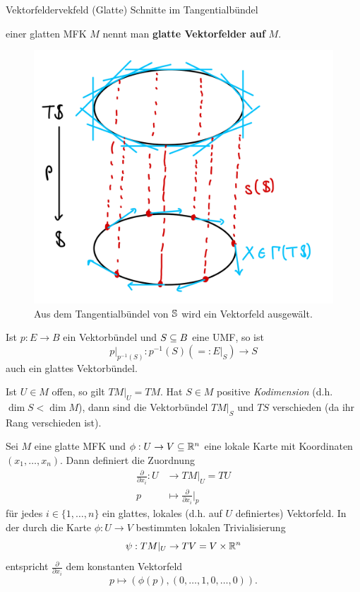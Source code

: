 \begin{definition}{Vektorfelder}{vekfeld}
(Glatte) Schnitte im Tangentialbündel 
einer glatten MFK $M$ nennt man \textbf{glatte Vektorfelder auf} $M$.
\begin{figure}[H]
\label{fig:vektorfeldaustang}
\centering
\includegraphics[width=0.3\linewidth]{Bilder/vektorfeldsph.png}
\caption{Aus dem Tangentialbündel von $\mathbb{S}$ wird ein Vektorfeld ausgewält.}
\end{figure}
\end{definition}
\begin{bemerkung}
Ist $p: E \to B$ ein Vektorbündel und $S \subseteq B$ eine UMF, so ist
\begin{equation}
p|_{p^{-1}(S)}: p^{-1}(S) (=: E|_S) \to S
\end{equation}
auch ein glattes Vektorbündel.
\end{bemerkung}
\begin{beispiel}
Ist $U \in M$ offen, so gilt $TM|_U = TM$. Hat $S \in M$ positive \textit{Kodimension} (d.h. $\dim S < \dim M$), dann sind die Vektorbündel $TM|_S$ und $TS$ verschieden (da ihr Rang verschieden ist).
\end{beispiel}
Sei $M$ eine glatte MFK und $\phi: U \to V \subseteq \mathbb{R}^n$ eine lokale Karte mit Koordinaten $(x_1, \dots, x_n)$. Dann definiert die Zuordnung
\begin{align}
\frac{\partial}{\partial x_i}: U &\to TM|_U = TU \\
p &\mapsto \frac{\partial}{\partial x_i}|_p
\end{align}
für jedes $i \in \{1, \dots, n \}$ ein glattes, lokales (d.h. auf $U$ definiertes) Vektorfeld. In der durch die Karte $\phi: U \to V$ bestimmten lokalen Trivialisierung
\begin{equation}
\psi: TM|_U \to TV = V \times \mathbb{R}^n
\end{equation}
entspricht $\frac{\partial}{\partial x_i}$ dem konstanten Vektorfeld
\begin{equation}
p \mapsto \left( \phi(p), (0, \dots, 1, 0, \dots, 0)\right).
\end{equation}
